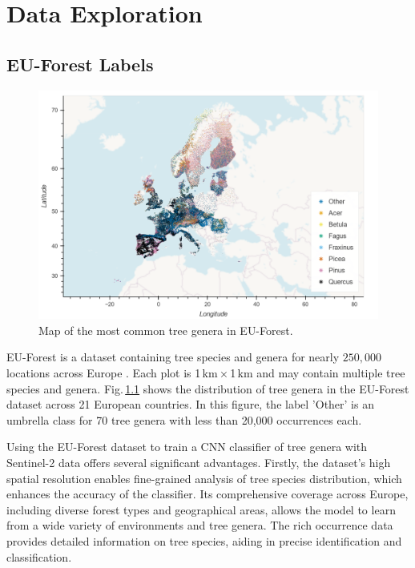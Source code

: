 \chapter{Data Exploration}
\label{chapter:data}
\section{EU-Forest Labels}

\begin{figure}[!thb]
    \centering
    \includegraphics[width=0.9\linewidth]{figures/figures_labels/genus_cutoff_map.png}
    \caption{Map of the most common tree genera in EU-Forest.}
    \label{fig:genus_cutoff_map}
\end{figure}

EU-Forest is a dataset containing tree species and genera for nearly $250,000$ locations across Europe \cite{eu_forest_data}. Each plot is 1\,km\,×\,1\,km and may contain multiple tree species and genera. Fig.\,\ref{fig:genus_cutoff_map} shows the distribution of tree genera in the EU-Forest dataset across 21 European countries. In this figure, the label 'Other' is an umbrella class for 70 tree genera with less than 20,000 occurrences each.

Using the EU-Forest dataset to train a CNN classifier of tree genera with Sentinel-2 data offers several significant advantages. Firstly, the dataset's high spatial resolution enables fine-grained 
analysis of tree species distribution, which enhances the accuracy of the classifier. Its comprehensive coverage across Europe, including diverse forest types and geographical areas, allows the model to learn from a wide variety of environments and tree genera. The rich occurrence data provides detailed information on tree species, aiding in precise identification and classification.

